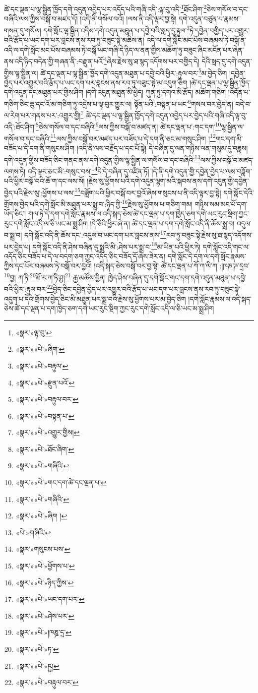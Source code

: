 ཚེ་དང་ལྡན་པ་ལྷ་སྦྱིན་ཁྱོད་དགེ་འདུན་འབྱེད་པར་འདོད་པའི་གཞི་འདི་:ལྟ་བུ་འདི་\footnote{«སྣར་»ལྟ་བུ་}ཐོང་ཤིག་\footnote{«སྣར་»«པེ་»ཞིག་}ཅེས་གསོལ་བ་དང་བཞིའི་ལས་ཀྱིས་བསྒོ་བ་མཛད་དོ། །འདི་ནི་གསོལ་བའོ། །ལས་ནི་འདི་ལྟར་བྱ་སྟེ། དགེ་འདུན་བཙུན་པ་རྣམས་གསན་དུ་གསོལ། དགེ་སློང་ལྷ་སྦྱིན་འདིས་དགེ་འདུན་མཐུན་པ་དབྱེ་བའི་སླད་དུ་རྟུལ་\footnote{«སྣར་»«པེ་»བརྟུལ་}ཏེ་དབྱེན་བགྱིད་པར་འགྱུར་བའི་རྩོད་པ་ཡང་དག་པར་བླངས་ནས་རབ་ཏུ་བཟུང་སྟེ་མཆིས་ན། འདི་ལ་དགེ་སློང་མང་པོས་བཞམས་ཏེ་བསྒོ་ན་འདི་ལ་དགེ་སློང་མང་པོས་བཞམས་ཏེ་བསྒོ་ཡང་གཞི་དེ་ཉིད་ལ་ནན་གྱིས་མཆོག་ཏུ་བཟུང་ཞིང་མངོན་པར་ཞེན་ནས་འདི་ཉིད་བདེན་གྱི་གཞན་ནི་:བརྫུན་པའོ་\footnote{«སྣར་»«པེ་»རྫུན་པའོ་}ཞེས་རྗེས་སུ་ཐ་སྙད་འདོགས་པར་བགྱིད་དེ། དེའི་སླད་དུ་དགེ་འདུན་གྱིས་ལྷ་སྦྱིན་ལ། ཚེ་དང་ལྡན་པ་ལྷ་སྦྱིན་ཁྱོད་དགེ་འདུན་མཐུན་པ་དབྱེ་བའི་ཕྱིར་:རྟུལ་བར་\footnote{«སྣར་»«པེ་»བརྟུལ་བར་}མ་བྱེད་ཅིག །དབྱེན་བྱེད་པར་འགྱུར་བའི་རྩོད་པ་ཡང་དག་པར་བླངས་ནས་རབ་ཏུ་བཟུང་སྟེ་མ་འདུག་ཅིག །ཚེ་དང་ལྡན་པ་ལྷ་སྦྱིན་ཁྱོད་དགེ་འདུན་དང་མཐུན་པར་གྱིས་ཤིག །དགེ་འདུན་མཐུན་མི་ཕྱེད། ཀུན་ཏུ་དགའ་མི་རྩོད། མཆོག་གཅིག །འདོན་པ་གཅིག་ཅིང་ཆུ་དང་འོ་མ་གཅིག་ཏུ་འདྲེས་པ་ལྟ་བུར་གྱུར་ལ། སྟོན་པའི་:བསྟན་པ་ཡང་\footnote{«སྣར་»«པེ་»བསྟན་པ་}གསལ་བར་བྱེད་ན། བདེ་བ་ལ་རེག་པར་གནས་པར་:འགྱུར་གྱི།\footnote{«སྣར་»«པེ་»འགྱུར་གྱིས།} ཚེ་དང་ལྡན་པ་ལྷ་སྦྱིན་ཁྱོད་དགེ་འདུན་འབྱེད་པར་བྱེད་པའི་གཞི་འདི་ལྟ་བུ་འདི་:ཐོང་ཤིག་\footnote{«སྣར་»«པེ་»ཐོང་ཞིག་}ཅེས་གསོལ་བ་དང་བཞིའི་\footnote{«སྣར་»«པེ་»གཞིའི་}ལས་ཀྱིས་བསྒོ་བ་མཛད་ན། ཚེ་དང་ལྡན་པ་:གང་དག་\footnote{«སྣར་»«པེ་»གང་དག་ཚེ་དང་ལྡན་པ་}ལྷ་སྦྱིན་ལ་གསོལ་བ་དང་བཞིའི་\footnote{«སྣར་»«པེ་»གཞིའི་}ལས་ཀྱིས་བསྒོ་བར་མཛད་པར་བཟོད་པ་དེ་དག་ནི་ཅང་མ་གསུང་ཤིག །\footnote{«སྣར་»«པེ་»ཞིག །}གང་དག་མི་བཟོད་པ་དེ་དག་ནི་གསུངས་ཤིག །འདི་ནི་ལས་བརྗོད་པ་དང་པོ་སྟེ། དེ་བཞིན་དུ་ལན་གཉིས་ལན་གསུམ་དུ་བཟླས། དགེ་འདུན་གྱིས་བཟོད་ཅིང་གནང་ནས་དགེ་འདུན་གྱིས་ལྷ་སྦྱིན་ལ་གསོལ་བ་དང་བཞིའི་\footnote{«པེ་»གཞིའི་}ལས་ཀྱིས་བསྒོ་བ་མཛད་ལགས་ཏེ། འདི་ལྟར་ཅང་མི་:གསུང་བས་\footnote{«སྣར་»གསུངས་པས་}དེ་དེ་བཞིན་དུ་འཛིན་ཏོ། །དེ་ནི་དགེ་འདུན་གྱི་དབྱེན་བྱེད་པ་ལས་བཟློག་པའི་ཕྱིར་བསྒོ་བའི་ཆོ་ག་དང་ལས་སོ། །རྗེས་སུ་ཕྱོགས་པའི་དགེ་འདུན་ལྷག་མའི་སྐབས་ནས་དགེ་འདུན་གྱི་དབྱེན་བྱེད་པའི་རྗེས་སུ་:ཕྱོགས་པ་ལས་\footnote{«སྣར་»«པེ་»ཕྱོགས་པ་}བཟློག་པའི་ཕྱིར་བསྒོ་བར་བྱའོ་ཞེས་གསུངས་པ་ནི་འདི་ལྟར་བྱ་སྟེ། དགེ་སློང་དེའི་གྲོགས་བྱེད་པའི་དགེ་སློང་མི་མཐུན་པར་སྨྲ་བ་:ཉིད་ཀྱི་\footnote{«སྣར་»«པེ་»ཉིད་ཀྱིས་}རྗེས་སུ་ཕྱོགས་པ་གཅིག་གམ། གཉིས་སམ་མང་པོ་དག་ཡོད་ཅིང་། གལ་ཏེ་དེ་དག་དགེ་སློང་རྣམས་ལ་འདི་སྐད་ཅེས་ཚེ་དང་ལྡན་པ་དག་ཁྱེད་ཅག་དགེ་ཡང་རུང་སྡིག་ཀྱང་རུང་དགེ་སློང་འདི་ལ་ཅི་ཡང་མ་སྨྲ་ཤིག །དེ་ཅིའི་ཕྱིར་ཞེ་ན། ཚེ་དང་ལྡན་པ་དག་དགེ་སློང་འདི་ནི་ཆོས་སྨྲ་བ། འདུལ་བ་སྨྲ་བ། དགེ་སློང་འདི་ནི་ཆོས་དང་:འདུལ་བ་ཡང་དག་པར་བླངས་ནས་\footnote{«སྣར་»«པེ་»ཡང་དག་པར་}རབ་ཏུ་བཟུང་སྟེ་རྗེས་སུ་ཐ་སྙད་འདོགས་པར་བྱེད་པ། དགེ་སློང་འདི་ནི་ཤེས་བཞིན་དུ་སྨྲའི་མི་:ཤེས་པར་སྨྲ་བ་\footnote{«སྣར་»«པེ་»ཤེས་པར་}མ་ཡིན་པའི་ཕྱིར་ཏེ། དགེ་སློང་འདི་གང་ལ་འདོད་ཅིང་བཟོད་པ་དེ་ལ་བདག་ཅག་ཀྱང་འདོད་ཅིང་བཟོད་དོ་ཞེས་ཟེར་ན། དགེ་སློང་དེ་དག་ལ་དགེ་སློང་རྣམས་ཀྱིས་དང་པོར་བཞམས་ཏེ་བསྒོ་བར་བྱའོ། །འདི་སྐད་ཅེས་བསྒོ་བར་བྱ་སྟེ། ཚེ་དང་ལྡན་པ་ཀོ་ཀ་ལི་ཀ :།ཁཎ་ཌ་དྲབ་\footnote{«སྣར་»«པེ་»།ཁཎྜ་དྲ་}བྱ། ཀ་ཏི་\footnote{«སྣར་»«པེ་»ཏ་}མོ་ར་ཀ་ཏི་ཤྱ།\footnote{«སྣར་»«པེ་»ཥྱ།} རྒྱ་མཚོས་བྱིན། ཁྱེད་ཤེས་བཞིན་དུ་དགེ་སློང་གང་དག་དགེ་འདུན་མཐུན་པ་དབྱེ་བའི་ཕྱིར་:རྟུལ་བར་\footnote{«སྣར་»«པེ་»བརྟུལ་བར་}བྱེད་ཅིང་དབྱེན་བྱེད་པར་འགྱུར་བའི་རྩོད་པ་ཡང་དག་པར་བླངས་ནས་རབ་ཏུ་བཟུང་སྟེ་འདུག་པ་དེའི་གྲོགས་བྱེད་ཅིང་མི་མཐུན་པར་སྨྲ་བའི་རྗེས་སུ་ཕྱོགས་པར་མ་བྱེད་ཅིག །དགེ་སློང་རྣམས་ལ་འདི་སྐད་ཅེས་ཚེ་དང་ལྡན་པ་དག་ཁྱེད་ཅག་དགེ་ཡང་རུང་སྡིག་ཀྱང་རུང་དགེ་སློང་འདི་ལ་ཅི་ཡང་མ་སྨྲ་ཤིག 